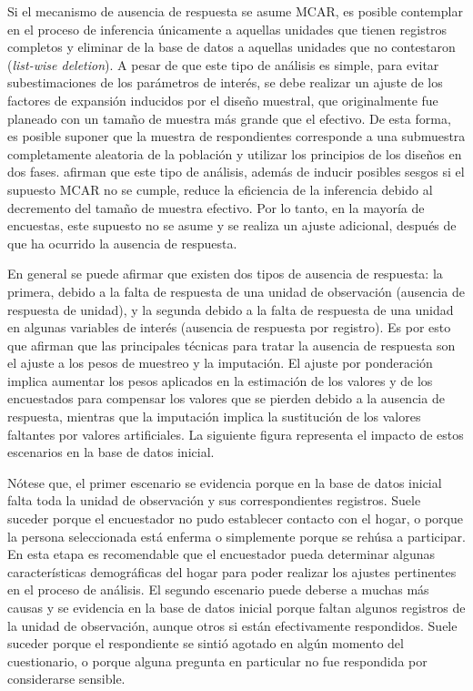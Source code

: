 \documentclass[
  10pt,
  spanish,
]{book}
\begin{document}
Si el mecanismo de ausencia de respuesta se asume MCAR, es posible contemplar en el proceso de inferencia únicamente a aquellas unidades que tienen registros completos y eliminar de la base de datos a aquellas unidades que no contestaron (\emph{list-wise deletion}). A pesar de que este tipo de análisis es simple, para evitar subestimaciones de los parámetros de interés, se debe realizar un ajuste de los factores de expansión inducidos por el diseño muestral, que originalmente fue planeado con un tamaño de muestra más grande que el efectivo. De esta forma, es posible suponer que la muestra de respondientes corresponde a una submuestra completamente aleatoria de la población y utilizar los principios de los diseños en dos fases. \citet[capítulo 11]{Heeringa_West_Berglund_2010} afirman que este tipo de análisis, además de inducir posibles sesgos si el supuesto MCAR no se cumple, reduce la eficiencia de la inferencia debido al decremento del tamaño de muestra efectivo. Por lo tanto, en la mayoría de encuestas, este supuesto no se asume y se realiza un ajuste adicional, después de que ha ocurrido la ausencia de respuesta.

En general se puede afirmar que existen dos tipos de ausencia de respuesta: la primera, debido a la falta de respuesta de una unidad de observación (ausencia de respuesta de unidad), y la segunda debido a la falta de respuesta de una unidad en algunas variables de interés (ausencia de respuesta por registro). Es por esto que \citet[sección 15.5]{Sarndal_Swensson_Wretman_2003} afirman que las principales técnicas para tratar la ausencia de respuesta son el ajuste a los pesos de muestreo y la imputación. El ajuste por ponderación implica aumentar los pesos aplicados en la estimación de los valores y de los encuestados para compensar los valores que se pierden debido a la ausencia de respuesta, mientras que la imputación implica la sustitución de los valores faltantes por valores artificiales. La siguiente figura representa el impacto de estos escenarios en la base de datos inicial.

Nótese que, el primer escenario se evidencia porque en la base de datos inicial falta toda la unidad de observación y sus correspondientes registros. Suele suceder porque el encuestador no pudo establecer contacto con el hogar, o porque la persona seleccionada está enferma o simplemente porque se rehúsa a participar. En esta etapa es recomendable que el encuestador pueda determinar algunas características demográficas del hogar para poder realizar los ajustes pertinentes en el proceso de análisis. El segundo escenario puede deberse a muchas más causas y se evidencia en la base de datos inicial porque faltan algunos registros de la unidad de observación, aunque otros si están efectivamente respondidos. Suele suceder porque el respondiente se sintió agotado en algún momento del cuestionario, o porque alguna pregunta en particular no fue respondida por considerarse sensible.
\end{document}
